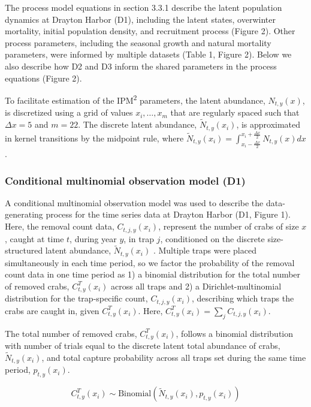\documentclass{article}
\begin{document}
The process model equations in section 3.3.1 describe the latent population dynamics at Drayton Harbor (D1), including the latent states, overwinter mortality, initial population density, and recruitment process (Figure 2). Other process parameters, including the seasonal growth and natural mortality parameters, were informed by multiple datasets (Table 1, Figure 2). Below we also describe how D2 and D3 inform the shared parameters in the process equations (Figure 2).

To facilitate estimation of the IPM\textsuperscript{2} parameters, the latent abundance, $N_{t,y}(x)$, is discretized using a grid of values $x_i , \ldots, x_m$ that are regularly spaced such that $\Delta x = 5$ and $m = 22$. The discrete latent abundance, $\tilde{N}_{t,y}(x_i)$, is approximated in kernel transitions by the midpoint rule, where $\tilde{N}_{t,y}(x_i) = \int_{x_i - \frac{\Delta x}{2}}^{x_i + \frac{\Delta x}{2}}N_{t,y}(x)dx$.

\subsubsection*{Conditional multinomial observation model (D1)}

A conditional multinomial observation model was used to describe the data-generating process for the time series data at Drayton Harbor (D1, Figure 1). Here, the removal count data, $C_{t,j,y}(x_i)$, represent the number of crabs of size $x$, caught at time $t$, during year $y$, in trap $j$, conditioned on the discrete size-structured latent abundance, $\tilde{N}_{t,y}(x_i)$ \parencite{kery2015modeling}. Multiple traps were placed simultaneously in each time period, so we factor the probability of the removal count data in one time period as 1) a binomial distribution for the total number of removed crabs, $C^T_{t,y}(x_i)$ across all traps and 2) a Dirichlet-multinomial distribution for the trap-specific count, $C_{t,j,y}(x_i)$, describing which traps the crabs are caught in, given $C^T_{t,y}(x_i)$. Here, $C^T_{t,y}(x_i) = \sum_jC_{t,j,y}(x_i)$. 

The total number of removed crabs, $C^T_{t,y}(x_i)$, follows a binomial distribution with number of trials equal to the discrete latent total abundance of crabs, $\tilde{N}_{t,y}(x_i)$, and total capture probability across all traps set during the same time period, $p_{t,y}(x_i)$.

\begin{equation}
C^T_{t,y}(x_i) \sim \text{Binomial}(\tilde{N}_{t,y}(x_i), p_{t,y}(x_i))
\end{equation}
\end{document}
